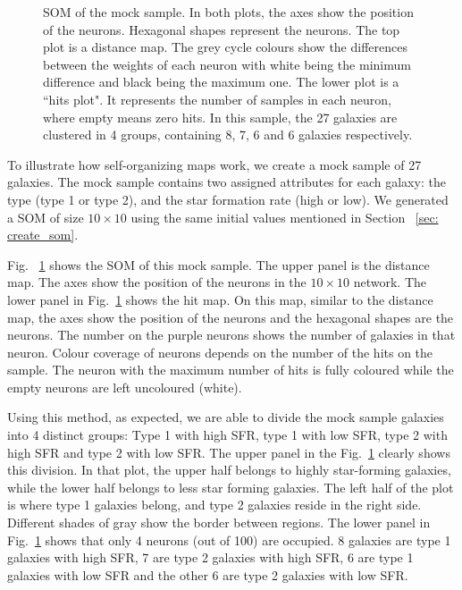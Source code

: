 \begin{figure}
\begin{subfigure}[b]{0.5\textwidth}
            \end{subfigure}
            \caption{SOM of the mock sample. In both plots, the axes show the position of the neurons. Hexagonal shapes represent the neurons. The top plot is a distance map. The grey cycle colours show the differences between the weights of each neuron with white being the minimum difference and black being the maximum one. The lower plot is a ``hits plot". It represents the number of samples in each neuron, where empty means zero hits. In this sample, the 27 galaxies are clustered in 4 groups, containing 8, 7, 6 and 6 galaxies respectively.}
            \label{fig: sample}
        \end{figure}
 
 To illustrate how self-organizing maps work, we create a mock sample of 27 galaxies.
 The mock sample contains two assigned attributes for each galaxy: the type (type 1 or type 2), and the star formation rate (high or low). %
 We generated a SOM of size $10 \times 10$ using the same initial values mentioned in Section ~\ref{sec: create_som}.

 Fig. ~\ref{fig: sample} shows the SOM of this mock sample. 
 The upper panel is the distance map. 
 The axes show the position of the neurons in the $10 \times 10$ network.
 The lower panel in Fig.~\ref{fig: sample} shows the hit map.
 On this map, similar to the distance map, the axes show the position of the neurons and the hexagonal shapes are the neurons.
 The number on the purple neurons shows the number of galaxies in that neuron.
 Colour coverage of neurons depends on the number of the hits on the sample.
 The neuron with the maximum number of hits is fully coloured while the empty neurons are left uncoloured (white). 
 
Using this method, as expected, we are able to divide the mock sample galaxies into 4 distinct groups: Type 1 with high SFR, type 1 with low SFR, type 2 with high SFR and type 2 with low SFR. 
The upper panel in the Fig.~\ref{fig: sample} clearly shows this division.
In that plot, the upper half belongs to highly star-forming galaxies, while the lower half belongs to less star forming galaxies.
The left half of the plot is where type 1 galaxies belong, and type 2 galaxies reside in the right side.
Different shades of gray show the border between regions.
The lower panel in Fig.~\ref{fig: sample} shows that only 4 neurons (out of 100) are occupied. 
8 galaxies are type 1 galaxies with high SFR, 7 are type 2 galaxies with high SFR, 6 are type 1 galaxies with low SFR and the other 6 are type 2 galaxies with low SFR. 

